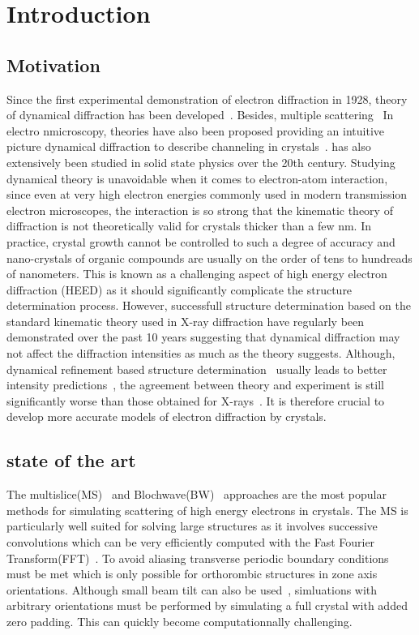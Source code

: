 \newcommand{\figsca}{0.45}
\section{Introduction}

\subsection{Motivation}
Since the first experimental demonstration of electron diffraction in 1928,
theory of dynamical diffraction has been developed~\cite{Bethe1928,CowleyBook}.
Besides, multiple scattering~\cite{Korringa1947,Kohn1954,Korringa1994,Dederichs1971}
In electro nmicroscopy, theories have also been proposed providing an intuitive picture
dynamical diffraction to describe channeling in crystals~\cite{VanDyck1995}.
has also extensively been studied in solid state physics over the 20th century.
Studying dynamical theory is unavoidable when it comes to electron-atom interaction,
since even at very high electron energies commonly used in modern transmission
electron microscopes, the interaction is so strong that the kinematic
theory of diffraction is not theoretically valid for crystals thicker than a
few nm\cite{GlaeserDowning1993,SubramanianSpence2015}. In practice, crystal
growth cannot be controlled to such a degree of accuracy and nano-crystals
of organic compounds are usually on the order of tens to hundreads of nanometers.
This is known as a challenging aspect of high energy electron diffraction (HEED) as it
should significantly complicate the structure determination process.
However, successfull structure determination based on the standard kinematic
theory used in X-ray diffraction have regularly been demonstrated over the
past 10 years\cite{Nannenga2014,Nannenga2019} suggesting that dynamical diffraction may
not affect the diffraction intensities as much as the theory suggests.
Although, dynamical refinement based structure determination~\cite{Palatinus2013} usually
leads to better intensity predictions~\cite{Gemmi2019b}, the agreement
between theory and experiment is still significantly worse than those obtained
for X-rays~\cite{Oleynikov2007}. It is therefore crucial to develop more
accurate models of electron diffraction by crystals.

\subsection{state of the art}
The multislice(MS)~\cite{CowleyMoodie1957} and Blochwave(BW)~\cite{Bethe1928}
approaches are the most popular methods for simulating scattering of high energy
electrons in crystals.
The MS is particularly well suited for solving large structures as it involves
successive convolutions which can be very efficiently computed with the Fast
Fourier Transform(FFT)~\cite{Ishizuka1977}. To avoid aliasing transverse periodic
boundary conditions must be met which is only possible for orthorombic
structures in zone axis orientations. Although small beam tilt can also be
used~\cite{Ishizuka1982,ChenDyck1997}, simluations with arbitrary orientations
must be performed by simulating a full crystal with added zero padding. This
can quickly become computationnally challenging.


